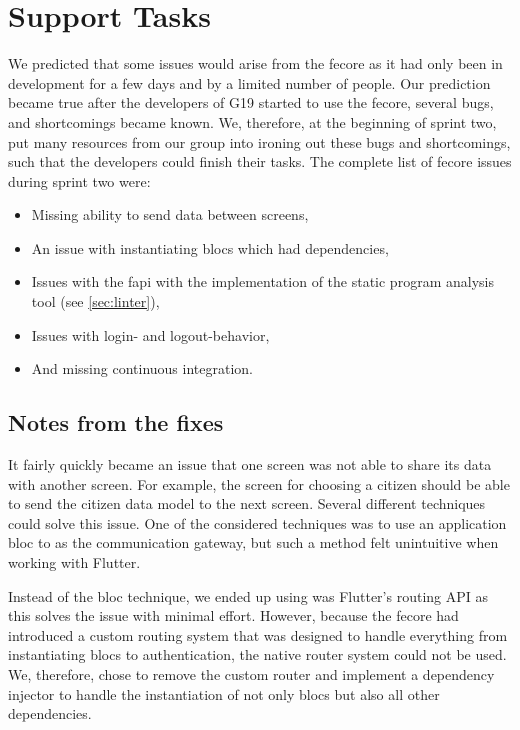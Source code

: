 \section{Support Tasks}
We predicted that some issues would arise from the \gls{fecore} as it had only been in development for a few days and by a limited number of people. Our prediction became true after the developers of \gls{G19} started to use the \gls{fecore}, several bugs, and shortcomings became known. We, therefore, at the beginning of sprint two, put many resources from our group into ironing out these bugs and shortcomings, such that the developers could finish their tasks. The complete list of \gls{fecore} issues during sprint two were:

\begin{itemize}
  \item Missing ability to send data between screens,
  \item An issue with instantiating \glspl{bloc} which had dependencies,
  \item Issues with the \gls{fapi} with the implementation of the static program analysis tool (see \autoref{sec:linter}),
  \item Issues with login- and logout-behavior,
  \item And missing continuous integration.
\end{itemize}

\subsection{Notes from the fixes}

It fairly quickly became an issue that one screen was not able to share its data with another screen. For example, the screen for choosing a citizen should be able to send the citizen data model to the next screen. Several different techniques could solve this issue. One of the considered techniques was to use an application \gls{bloc} to as the communication gateway, but such a method felt unintuitive when working with Flutter. 

Instead of the \gls{bloc} technique, we ended up using was Flutter's routing API as this solves the issue with minimal effort. However, because the \gls{fecore} had introduced a custom routing system that was designed to handle everything from instantiating \glspl{bloc} to authentication, the native router system could not be used. We, therefore, chose to remove the custom router and implement a dependency injector to handle the instantiation of not only \glspl{bloc} but also all other dependencies.

